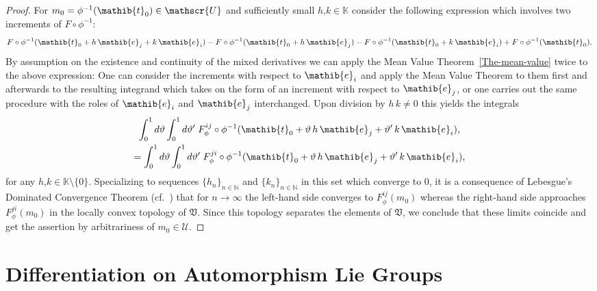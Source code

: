\documentclass[11pt,twoside,openright]{report}
\theoremstyle{definition}
\theoremstyle{plain}
\theoremstyle{remark}
\theoremstyle{assumption}
\newcommand{\set}[1]{\{ #1 \}}
\newcommand{\Kbb}{\mathbb{K}}
\newcommand{\Nbb}{\mathbb{N}}
\newcommand{\Vfrak}{\mathfrak{V}}
\newcommand{\eib}{\mathib{e}}
\newcommand{\tib}{\mathib{t}}
\newcommand{\Uscr}{\mathscr{U}}
\begin{document}
\begin{proof}
  For $m_0 = \phi^{-1} ( \tib_0 ) \in \Uscr$ and sufficiently small $h
  \text{,} k \in \Kbb$ consider the following expression which
  involves two increments of $F \circ \phi^{-1}$:
  \begin{equation*}
    F \circ \phi^{-1} ( \tib_0 + h \, \eib_j + k \, \eib_i ) - F \circ
    \phi^{-1} ( \tib_0 + h \, \eib_j ) - F \circ \phi^{-1} ( \tib_0 +
    k \, \eib_i ) + F \circ \phi^{-1} ( \tib_0 ) \text{.}  
  \end{equation*}
  By assumption on the existence and continuity of the mixed
  derivatives we can apply the Mean Value Theorem~\ref{The-mean-value}
  twice to the above expression: One can consider the increments with
  respect to $\eib_i$ and apply the Mean Value Theorem to them first
  and afterwards to the resulting integrand which takes on the form of
  an increment with respect to $\eib_j$, or one carries out the same 
  procedure with the roles of $\eib_i$ and $\eib_j$ interchanged. Upon
  division by $h \, k \not= 0$ this yields the integrals 
  \begin{multline*}
    \int_0^1 d \vartheta \int_0^1 d \vartheta' \; F_\phi^{i j} \circ
    \phi^{-1} ( \tib_0 + \vartheta \, h \, \eib_j + \vartheta' \, k \,
    \eib_i ) \text{,} \\
    = \int_0^1 d \vartheta \int_0^1 d \vartheta' \; F_\phi^{j i} \circ
    \phi^{-1} ( \tib_0 + \vartheta \, h \, \eib_j + \vartheta' \, k \,
    \eib_i ) \text{,}
  \end{multline*}
  for any $h \text{,} k \in \Kbb \setminus \set{0}$. Specializing to
  sequences $\set{h_n}_{n \in \Nbb}$ and $\set{k_n}_{n \in \Nbb}$ in
  this set which converge to $0$, it is a consequence of Lebesgue's
  Dominated Convergence Theorem (cf.~\cite[II.5.6 and
  II.6.2]{fell/doran:1988a}) that for $n \rightarrow \infty$ the
  left-hand side converges to $F_\phi^{i j} ( m_0 )$ whereas the
  right-hand side approaches $F_\phi^{j i} ( m_0 )$ in the locally
  convex topology of $\Vfrak$. Since this topology separates the
  elements of $\Vfrak$, we conclude that these limits coincide and get
  the assertion by arbitrariness of $m_0 \in \Uscr$.
\end{proof}


\section{Differentiation on Automorphism Lie Groups}
\end{document}
